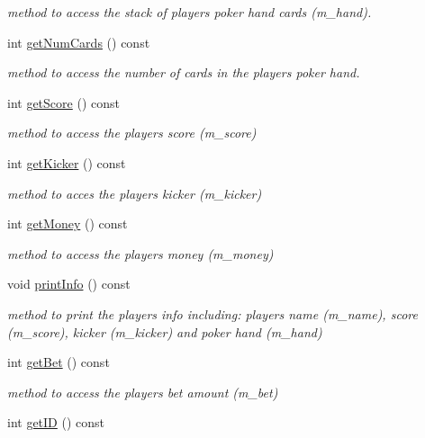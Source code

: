 \begin{DoxyCompactItemize}
\begin{DoxyCompactList}\small\item\em method to access the stack of players poker hand cards (m\-\_\-hand). \end{DoxyCompactList}\item 
int \hyperlink{classplayer_a3a96a6a88b2ebeed6700cd6725f83f5a}{get\-Num\-Cards} () const 
\begin{DoxyCompactList}\small\item\em method to access the number of cards in the players poker hand. \end{DoxyCompactList}\item 
int \hyperlink{classplayer_a3663784b926e6df4b866bf3a25256adc}{get\-Score} () const 
\begin{DoxyCompactList}\small\item\em method to access the players score (m\-\_\-score) \end{DoxyCompactList}\item 
int \hyperlink{classplayer_acff004025f4728885327eda9197bcd61}{get\-Kicker} () const 
\begin{DoxyCompactList}\small\item\em method to acces the players kicker (m\-\_\-kicker) \end{DoxyCompactList}\item 
int \hyperlink{classplayer_a17e4e4d85fb2d4e7335b2c1360af5612}{get\-Money} () const 
\begin{DoxyCompactList}\small\item\em method to access the players money (m\-\_\-money) \end{DoxyCompactList}\item 
void \hyperlink{classplayer_a019136df8e6ee2a429015927149f7750}{print\-Info} () const 
\begin{DoxyCompactList}\small\item\em method to print the players info including\-: players name (m\-\_\-name), score (m\-\_\-score), kicker (m\-\_\-kicker) and poker hand (m\-\_\-hand) \end{DoxyCompactList}\item 
int \hyperlink{classplayer_a6c58c32e556a70d2f3f718bd477530ea}{get\-Bet} () const 
\begin{DoxyCompactList}\small\item\em method to access the players bet amount (m\-\_\-bet) \end{DoxyCompactList}\item 
int \hyperlink{classplayer_a349d34f7e3875773b95ed391844f5037}{get\-I\-D} () const 

\end{DoxyCompactItemize}
